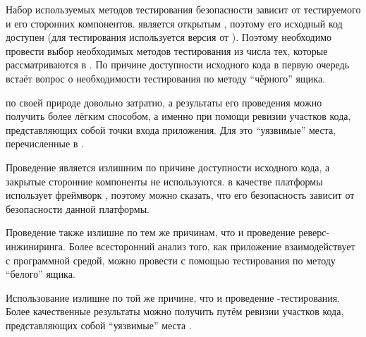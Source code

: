 %
Набор используемых методов тестирования безопасности  зависит от  тестируемого  и его сторонних компонентов.
%
 является открытым , поэтому его исходный код доступен  (для тестирования используется версия  от ). 
%
Поэтому необходимо провести выбор необходимых методов тестирования из числа тех, которые рассматриваются в .
%
По причине доступности исходного кода в первую очередь встаёт вопрос о необходимости тестирования по методу ``чёрного'' ящика. 



%
 по своей природе довольно затратно, а результаты его проведения можно получить более лёгким способом, а именно при помощи ревизии участков кода, представляющих собой точки входа приложения.
%
Для  это ``уязвимые'' места, перечисленные в . 

%
Проведение  является излишним по причине доступности исходного кода, а закрытые сторонние компоненты не используются. 
%
 в качестве платформы использует фреймворк  , поэтому можно сказать, что его безопасность зависит от безопасности данной платформы. 

%
Проведение  также излишне по тем же причинам, что и проведение реверс-инжиниринга. 
%
Более всесторонний анализ того, как приложение взаимодействует с программной средой, можно провести с помощью тестирования по методу ``белого'' ящика. 
%

%
Использование  излишне по той же причине, что и проведение -тестирования. 
%
Более качественные результаты можно получить путём ревизии участков кода, представляющих собой ``уязвимые'' места . 

